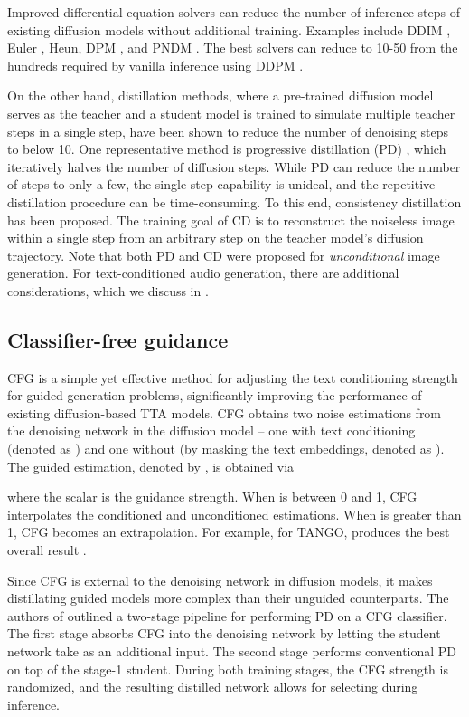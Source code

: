 \documentclass{article}
\begin{document}
Improved differential equation solvers can reduce the number of inference steps  of existing diffusion models without additional training. Examples include DDIM \cite{ddim}, Euler \cite{euler}, Heun, DPM \cite{dpm, dpm++}, and PNDM \cite{pndm}. The best solvers can reduce  to 10-50 from the hundreds required by vanilla inference using DDPM \cite{ddpm}.

On the other hand, distillation methods, where a pre-trained diffusion model serves as the teacher and a student model is trained to simulate multiple teacher steps in a single step, have been shown to reduce the number of denoising steps to below 10. One representative method is progressive distillation (PD) \cite{pd}, which iteratively halves the number of diffusion steps. While PD can reduce the number of steps to only a few, the single-step capability is unideal, and the repetitive distillation procedure can be time-consuming. To this end, consistency distillation \cite{cm} has been proposed. The training goal of CD is to reconstruct the noiseless image within a single step from an arbitrary step on the teacher model's diffusion trajectory. Note that both PD and CD were proposed for \textit{unconditional} image generation. For text-conditioned audio generation, there are additional considerations, which we discuss in .


\subsection{Classifier-free guidance}

CFG \cite{cfg} is a simple yet effective method for adjusting the text conditioning strength for guided generation problems, significantly improving the performance of existing diffusion-based TTA models. CFG obtains two noise estimations from the denoising network in the diffusion model -- one with text conditioning (denoted as ) and one without (by masking the text embeddings, denoted as ). The guided estimation, denoted by , is obtained via
\vspace{-.4mm}

where the scalar  is the guidance strength. When  is between 0 and 1, CFG interpolates the conditioned and unconditioned estimations. When  is greater than 1, CFG becomes an extrapolation. For example, for TANGO,  produces the best overall result \cite{tango}.

Since CFG is external to the denoising network in diffusion models, it makes distillating guided models more complex than their unguided counterparts. The authors of \cite{distillcfg} outlined a two-stage pipeline for performing PD on a CFG classifier. The first stage absorbs CFG into the denoising network by letting the student network take  as an additional input. The second stage performs conventional PD on top of the stage-1 student. During both training stages, the CFG strength  is randomized, and the resulting distilled network allows for selecting  during inference.
\end{document}
